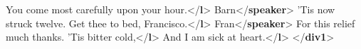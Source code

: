 \begin{shaded}
\hspace*{1em}\hspace*{1em}You come most carefully upon your hour.{</\textbf{l}>}\mbox{}\newline 
\hspace*{1em}\mbox{}\newline 
\hspace*{1em}\mbox{}\newline 
\hspace*{1em}\hspace*{1em}Barn{</\textbf{speaker}>}\mbox{}\newline 
\hspace*{1em}\hspace*{1em}'Tis now struck twelve. Get thee to bed, Francisco.{</\textbf{l}>}\mbox{}\newline 
\hspace*{1em}\mbox{}\newline 
\hspace*{1em}\mbox{}\newline 
\hspace*{1em}\hspace*{1em}Fran{</\textbf{speaker}>}\mbox{}\newline 
\hspace*{1em}\hspace*{1em}For this relief much thanks. 'Tis bitter cold,{</\textbf{l}>}\mbox{}\newline 
\hspace*{1em}\hspace*{1em}And I am sick at heart.{</\textbf{l}>}\mbox{}\newline 
\hspace*{1em}\mbox{}\newline 
{}\mbox{}\newline 
{</\textbf{div1}>}\end{shaded}\egroup\par \par
